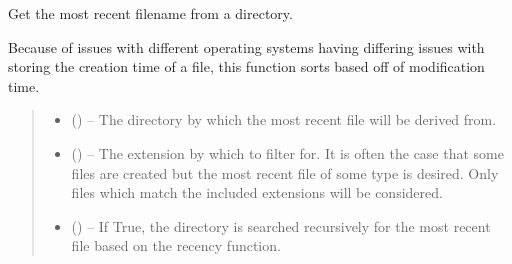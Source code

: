 \documentclass[letterpaper,11pt,english]{sphinxmanual}
\begin{document}
\begin{savenotes}\begin{fulllineitems}
\label{\detokenize{code/lezargus.library.path:lezargus.library.path.get_most_recent_filename_in_directory}}
\pysigstartsignatures
{}
\pysigstopsignatures
\sphinxAtStartPar
Get the most recent filename from a directory.

\sphinxAtStartPar
Because of issues with different operating systems having differing
issues with storing the creation time of a file, this function sorts based
off of modification time.
\begin{quote}\begin{description}
\begin{itemize}
\item {} 
\sphinxAtStartPar
{} () – The directory by which the most recent file will be derived from.

\item {} 
\sphinxAtStartPar
{} (\sphinxstyleliteralemphasis{\sphinxupquote{, }}) – The extension by which to filter for. It is often the case that some
files are created but the most recent file of some type is desired.
Only files which match the included extensions will be considered.

\item {} 
\sphinxAtStartPar
{} (\sphinxstyleliteralemphasis{\sphinxupquote{, }}) – If True, the directory is searched recursively for the most recent file
based on the recency function.


\end{itemize}
\end{description}
\end{quote}
\end{fulllineitems}
\end{savenotes}
\end{document}
